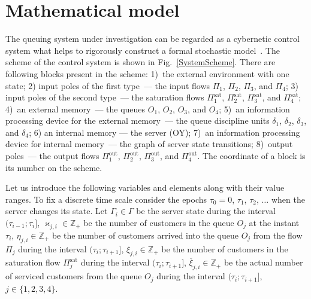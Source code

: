 \documentclass[runningheads,a4paper]{llncs}
\begin{document}
\section{Mathematical model}
The queuing system under investigation can be regarded as a cybernetic control system what helps to
rigorously construct a formal stochastic model~\cite{z:2012}. The scheme of the control system is
shown in Fig.~\ref{SystemScheme}. There are following blocks present in the scheme: 1)~the external
environment with one state; 2) input poles of the first type~--- the input flows $\Pi_1$, $\Pi_2$,
$\Pi_3$, and $\Pi_4$; 3) input poles of the second type~--- the saturation flows
$\Pi^{\mathrm{\text{sat}}}_1$, $\Pi^{\mathrm{\text{sat}}}_2$, $\Pi^{\mathrm{\text{sat}}}_3$, and
$\Pi^{\mathrm{\text{sat}}}_4$; 4)~an external memory~--- the queues $O_1$, $O_2$, $O_3$, and $O_4$;
5)~an information processing device for the external memory~--- the queue discipline units
$\delta_1$, $\delta_2$, $\delta_3$, and $\delta_4$; 6) an internal memory --- the server (OY); 7)~an
information processing device for internal memory~--- the graph of server state transitions;
8)~output poles~--- the output flows $\Pi^{\mathrm{\text{out}}}_1$, $\Pi^{\mathrm{\text{out}}}_2$,
$\Pi^{\mathrm{\text{out}}}_3$, and $\Pi^{\mathrm{\text{out}}}_4$.  The coordinate of a block is
its number on the scheme.

Let us  introduce the following variables and elements along with their
value ranges. To fix a discrete time scale consider the epochs $\tau_0=0$, $\tau_1$, $\tau_2$,
$\ldots$ when the server changes its state. Let $\Gamma_i\in\Gamma$ be the server state
during the interval $(\tau_{i-1};\tau_i]$, $\varkappa_{j,i} \in \mathbb{Z}_+ $ be the number of customers in
the queue $O_j$ at the instant $\tau_i$, $\eta_{j,i} \in \mathbb{Z}_+$ be the number of customers
arrived into the queue $O_j$ from the flow $\Pi_j$ during the interval $(\tau_{i};\tau_{i+1}]$, $\xi_{j,i} \in
\mathbb{Z}_+$ be the number of customers in the saturation flow $\Pi^{\mathrm{\text{sat}}}_j$ during
the interval $(\tau_{i};\tau_{i+1}]$, $\overline{\xi}_{j,i}\in \mathbb{Z}_+$ be the actual number of 
serviced customers from the queue  $O_j$ during the interval $(\tau_{i};\tau_{i+1}]$, $j\in
\{1,2,3,4\}$.
\end{document}
